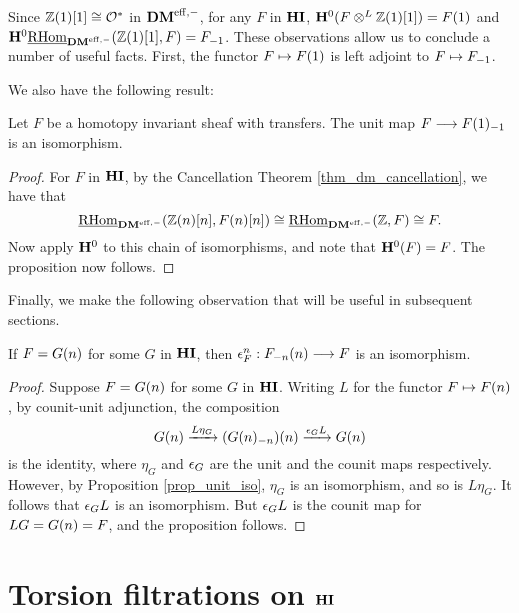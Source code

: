 Since $\Z(1)[1] \cong \O^*$ in $\DMeff$, for any $F$ in $\HI$, 
$\HH^0(F \tDM \Z(1)[1]) = \LHI{F}$ and $\HH^0\ihomDMf(\Z(1)[1], F) 
= \RHI{F}$. These observations allow us to conclude a number of useful
facts. First, the functor $F \mapsto \LHI{F}$ is left adjoint to 
$F \mapsto \RHI{F}$. 

We also have the following result:

\begin{prop}\label{prop_unit_iso}
Let $F$ be a homotopy invariant sheaf with transfers. The unit map 
$F \to \RHI{\LHI{F}}$ is an isomorphism.
\end{prop}
\begin{proof}
For $F$ in $\HI$, by the Cancellation Theorem 
\ref{thm_dm_cancellation}, we have that 
\[
\ihomDMf(\Z(n)[n], F(n)[n]) \cong \ihomDMf(\Z, F) 
\cong F. 
\]
Now apply $\HH^0$ to this chain of isomorphisms, and note 
that $\HH^0(F) = F$. The proposition now follows.
\end{proof}

Finally, we make the following observation that will be useful
in subsequent sections.

\begin{prop}\label{prop_counit_iso_for_HIn}
If $F = \LHI[n]{G}$ for some $G$ in $\HI$, then $\cuHI^n_F : 
\LHI[n]{\RHI[n]{F}} \to F$ is an isomorphism.
\end{prop}
\begin{proof}
Suppose $F = \LHI[n]{G}$ for some $G$ in $\HI$. Writing $L$ for 
the functor 
$F \mapsto \LHI[n]F$, by counit-unit adjunction, the composition
\[
\LHI[n]{G} \xrightarrow{L\eta_G} \LHI[n]{(\RHI[n]{\LHI[n]{G}})}
   \xrightarrow{\cuHI_G L} \LHI[n]{G}
\]
is the identity, where $\eta_{G}$ and $\cuHI_{G}$ are the unit and 
the counit maps respectively. However, by Proposition \ref{prop_unit_iso}, 
$\eta_{G}$ is an isomorphism, and so is $L\eta_{G}$. It follows
that $\cuHI_G L$ is an isomorphism. But $\cuHI_G L$ is the counit
map for $LG = \LHI[n]{G} = F$, and the proposition follows.
\end{proof}

\section{Torsion filtrations on $\HI$}

